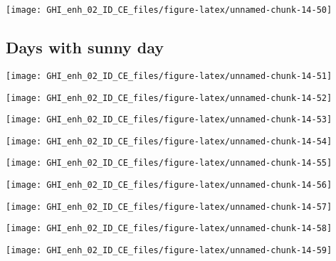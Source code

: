 \documentclass[
  10pt,
  a4paper,oneside]{article}
\begin{document}
\begin{center}\texttt{[image: GHI\_enh\_02\_ID\_CE\_files/figure-latex/unnamed-chunk-14-50]} \end{center}

\FloatBarrier

\hypertarget{days-with-sunny-day}{%
\subsection{Days with sunny day}\label{days-with-sunny-day}}

\begin{center}\texttt{[image: GHI\_enh\_02\_ID\_CE\_files/figure-latex/unnamed-chunk-14-51]} \end{center}

\begin{center}\texttt{[image: GHI\_enh\_02\_ID\_CE\_files/figure-latex/unnamed-chunk-14-52]} \end{center}

\begin{center}\texttt{[image: GHI\_enh\_02\_ID\_CE\_files/figure-latex/unnamed-chunk-14-53]} \end{center}

\begin{center}\texttt{[image: GHI\_enh\_02\_ID\_CE\_files/figure-latex/unnamed-chunk-14-54]} \end{center}

\begin{center}\texttt{[image: GHI\_enh\_02\_ID\_CE\_files/figure-latex/unnamed-chunk-14-55]} \end{center}

\begin{center}\texttt{[image: GHI\_enh\_02\_ID\_CE\_files/figure-latex/unnamed-chunk-14-56]} \end{center}

\begin{center}\texttt{[image: GHI\_enh\_02\_ID\_CE\_files/figure-latex/unnamed-chunk-14-57]} \end{center}

\begin{center}\texttt{[image: GHI\_enh\_02\_ID\_CE\_files/figure-latex/unnamed-chunk-14-58]} \end{center}

\begin{center}\texttt{[image: GHI\_enh\_02\_ID\_CE\_files/figure-latex/unnamed-chunk-14-59]} \end{center}
\end{document}
